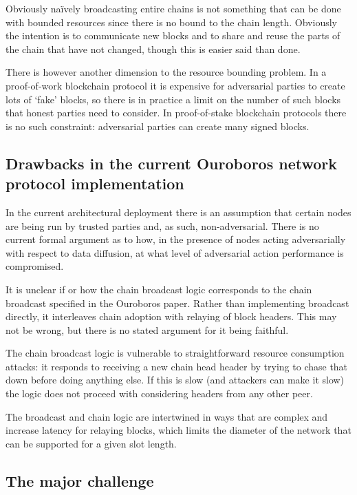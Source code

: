 \documentclass{article}
\theoremstyle{definition}{
  \newtheorem{lemma}{Lemma}[section] %
  \newtheorem{definition}[lemma]{Definition}
}
\theoremstyle{theorem}{
  \newtheorem{invariant}[lemma]{Invariant}
  \newtheorem{proofobligation}[lemma]{Proof Obligation}
}
\numberwithin{equation}{lemma}
\begin{document}
Obviously na\"ively broadcasting entire chains is not something that can be
done with bounded resources since there is no bound to the chain length.
Obviously the intention is to communicate new blocks and to share and reuse the
parts of the chain that have not changed, though this is easier said than done.

There is however another dimension to the resource bounding problem. In a
proof-of-work blockchain protocol it is expensive for adversarial parties to
create lots of `fake' blocks, so there is in practice a limit on the number of
such blocks that honest parties need to consider. In proof-of-stake blockchain
protocols there is no such constraint: adversarial parties can create many
signed blocks.

\subsection{Drawbacks in the current Ouroboros network protocol implementation}

In the current architectural deployment there is an assumption that certain
nodes are being run by trusted parties and, as such, non-adversarial. There is
no current formal argument as to how, in the presence of nodes acting
adversarially with respect to data diffusion, at what level of adversarial
action performance is compromised.

It is unclear if or how the chain broadcast logic corresponds to the chain
broadcast specified in the Ouroboros paper. Rather than implementing broadcast
directly, it interleaves chain adoption with relaying of block headers. This
may not be wrong, but there is no stated argument for it being faithful.

The chain broadcast logic is vulnerable to straightforward resource consumption
attacks: it responds to receiving a new chain head header by trying to chase
that down before doing anything else. If this is slow (and attackers can make
it slow) the logic does not proceed with considering headers from any other
peer.

The broadcast and chain logic are intertwined in ways that are complex and
increase latency for relaying blocks, which limits the diameter of the network
that can be supported for a given slot length.

\subsection{The major challenge}
\end{document}
